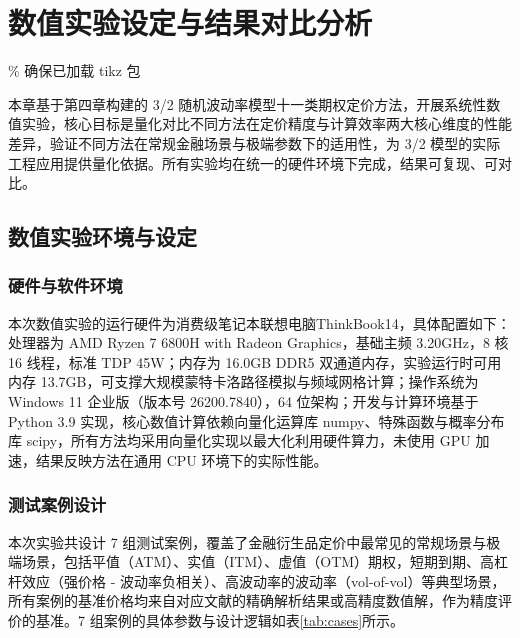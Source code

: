 \chapter{数值实验设定与结果对比分析}\label{chap:empirical} \% 确保已加载 tikz 包

本章基于第四章构建的 3/2 随机波动率模型十一类期权定价方法，开展系统性数值实验，核心目标是量化对比不同方法在定价精度与计算效率两大核心维度的性能差异，验证不同方法在常规金融场景与极端参数下的适用性，为 3/2 模型的实际工程应用提供量化依据。所有实验均在统一的硬件环境下完成，结果可复现、可对比。

\section{数值实验环境与设定}

\subsection{硬件与软件环境}
本次数值实验的运行硬件为消费级笔记本联想电脑ThinkBook14，具体配置如下：处理器为 AMD Ryzen 7 6800H with Radeon Graphics，基础主频 3.20GHz，8 核 16 线程，标准 TDP 45W；内存为 16.0GB DDR5 双通道内存，实验运行时可用内存 13.7GB，可支撑大规模蒙特卡洛路径模拟与频域网格计算；操作系统为 Windows 11 企业版（版本号 26200.7840），64 位架构；开发与计算环境基于 Python 3.9 实现，核心数值计算依赖向量化运算库 numpy、特殊函数与概率分布库 scipy，所有方法均采用向量化实现以最大化利用硬件算力，未使用 GPU 加速，结果反映方法在通用 CPU 环境下的实际性能。

\subsection{测试案例设计}
本次实验共设计 7 组测试案例，覆盖了金融衍生品定价中最常见的常规场景与极端场景，包括平值（ATM）、实值（ITM）、虚值（OTM）期权，短期到期、高杠杆效应（强价格 - 波动率负相关）、高波动率的波动率（vol-of-vol）等典型场景，所有案例的基准价格均来自对应文献的精确解析结果或高精度数值解，作为精度评价的基准。7 组案例的具体参数与设计逻辑如表\ref{tab:cases}所示。

